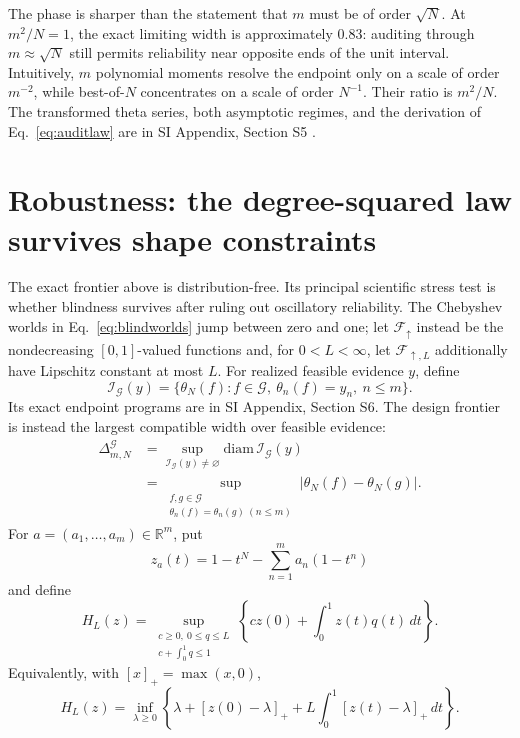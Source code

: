 \documentclass[10pt,twocolumn]{article}
\newcommand{\cF}{\mathcal F}
\begin{document}
The phase is sharper than the statement that $m$ must be of order $\sqrt N$. At $m^2/N=1$, the exact limiting width is approximately $0.83$: auditing through $m\approx\sqrt N$ still permits reliability near opposite ends of the unit interval. Intuitively, $m$ polynomial moments resolve the endpoint only on a scale of order $m^{-2}$, while best-of-$N$ concentrates on a scale of order $N^{-1}$. Their ratio is $m^2/N$. The transformed theta series, both asymptotic regimes, and the derivation of Eq.~\ref{eq:auditlaw} are in SI Appendix, Section S5 \citep{whittaker1927}.

\section*{Robustness: the degree-squared law survives shape constraints}

The exact frontier above is distribution-free. Its principal scientific stress test is whether blindness survives after ruling out oscillatory reliability. The Chebyshev worlds in Eq.~\ref{eq:blindworlds} jump between zero and one; let $\cF_\uparrow$ instead be the nondecreasing $[0,1]$-valued functions and, for $0<L<\infty$, let $\cF_{\uparrow,L}$ additionally have Lipschitz constant at most $L$. For realized feasible evidence $y$, define
\begin{equation}
\mathcal I_{\mathcal G}(y)
=\{\theta_N(f):f\in\mathcal G,\ \theta_n(f)=y_n,\ n\le m\}.
\label{eq:shapeidentifiedset}
\end{equation}
Its exact endpoint programs are in SI Appendix, Section S6. The design frontier is instead the largest compatible width over feasible evidence:
\begin{equation}
\begin{aligned}
\Delta^{\mathcal G}_{m,N}
&=\sup_{\mathcal I_{\mathcal G}(y)\ne\varnothing}
  \mathrm{diam}\,\mathcal I_{\mathcal G}(y)\\
&=\sup_{\substack{f,g\in\mathcal G\\
\theta_n(f)=\theta_n(g)\ (n\le m)}}
  \bigl|\theta_N(f)-\theta_N(g)\bigr|.
\end{aligned}
\label{eq:shapeambiguity}
\end{equation}
For $a=(a_1,\ldots,a_m)\in\mathbb R^m$, put
\begin{equation}
z_a(t)=1-t^N-\sum_{n=1}^ma_n(1-t^n)
\label{eq:tailresidual}
\end{equation}
and define
\begin{equation}
H_L(z)=\sup_{\substack{c\ge0,\ 0\le q\le L\\c+\int_0^1q\le1}}
\left\{cz(0)+\int_0^1z(t)q(t)\,dt\right\}.
\label{eq:cappedtail}
\end{equation}
Equivalently, with $[x]_+=\max(x,0)$,
\begin{equation}
H_L(z)=\inf_{\lambda\ge0}
\left\{\lambda+[z(0)-\lambda]_+
+L\int_0^1[z(t)-\lambda]_+\,dt\right\}.
\label{eq:cappedthreshold}
\end{equation}
\end{document}
